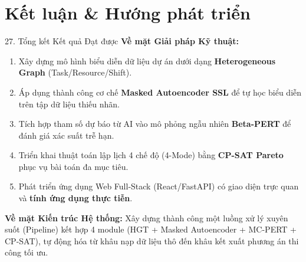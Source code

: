 \section{Kết luận \& Hướng phát triển}

\begin{frame}{27. Tổng kết Kết quả Đạt được}
    \textbf{Về mặt Giải pháp Kỹ thuật:}
    \begin{enumerate}
        \item Xây dựng mô hình biểu diễn dữ liệu dự án dưới dạng \textbf{Heterogeneous Graph} (Task/Resource/Shift).
        \item Áp dụng thành công cơ chế \textbf{Masked Autoencoder SSL} để tự học biểu diễn trên tập dữ liệu thiếu nhãn.
        \item Tích hợp tham số dự báo từ AI vào mô phỏng ngẫu nhiên \textbf{Beta-PERT} để đánh giá xác suất trễ hạn.
        \item Triển khai thuật toán lập lịch 4 chế độ (4-Mode) bằng \textbf{CP-SAT Pareto} phục vụ bài toán đa mục tiêu.
        \item Phát triển ứng dụng Web Full-Stack (React/FastAPI) có giao diện trực quan và \textbf{tính ứng dụng thực tiễn}.
    \end{enumerate}
    
    \vspace{0.2cm}
    \textbf{Về mặt Kiến trúc Hệ thống:} 
    Xây dựng thành công một luồng xử lý xuyên suốt (Pipeline) kết hợp 4 module (HGT + Masked Autoencoder + MC-PERT + CP-SAT), tự động hóa từ khâu nạp dữ liệu thô đến khâu kết xuất phương án thi công tối ưu.
\end{frame}

